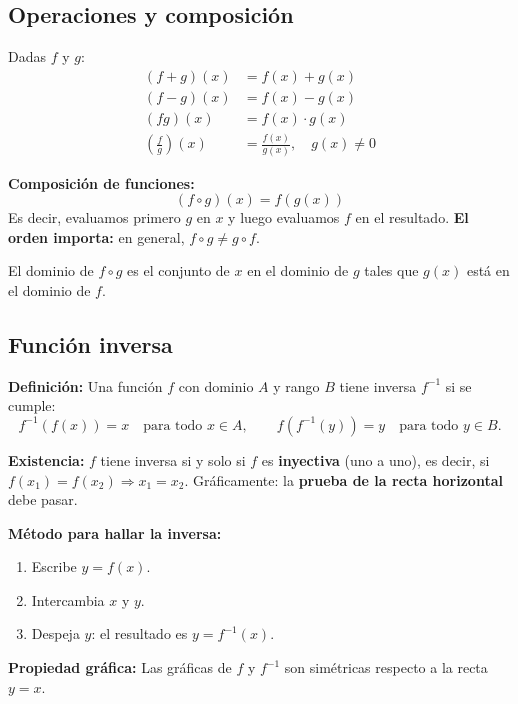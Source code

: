 \documentclass[12pt, letterpaper]{article}
\begin{document}
\subsection{Operaciones y composición}

\begin{cuadroteoria}
  Dadas $f$ y $g$:
  \begin{align*}
    (f + g)(x)                  & = f(x) + g(x)                          \\
    (f - g)(x)                  & = f(x) - g(x)                          \\
    (fg)(x)                     & = f(x) \cdot g(x)                      \\
    \left(\frac{f}{g}\right)(x) & = \frac{f(x)}{g(x)}, \quad g(x) \neq 0
  \end{align*}
\end{cuadroteoria}

\begin{cuadrosolucion}
  \textbf{Composición de funciones:}
  $$(f \circ g)(x) = f(g(x))$$
  Es decir, evaluamos primero $g$ en $x$ y luego evaluamos $f$ en el resultado. \textbf{El orden importa:} en general, $f \circ g \neq g \circ f$.

  El dominio de $f \circ g$ es el conjunto de $x$ en el dominio de $g$ tales que $g(x)$ está en el dominio de $f$.
\end{cuadrosolucion}

\newpage

\subsection{Función inversa}

\begin{cuadroteoria}
  \textbf{Definición:} Una función $f$ con dominio $A$ y rango $B$ tiene inversa $f^{-1}$ si se cumple:
  $$f^{-1}(f(x)) = x \quad \text{para todo } x \in A, \qquad f(f^{-1}(y)) = y \quad \text{para todo } y \in B.$$

  \textbf{Existencia:} $f$ tiene inversa si y solo si $f$ es \textbf{inyectiva} (uno a uno), es decir, si $f(x_1) = f(x_2) \Rightarrow x_1 = x_2$. Gráficamente: la \textbf{prueba de la recta horizontal} debe pasar.

  \textbf{Método para hallar la inversa:}
  \begin{enumerate}[leftmargin=*]
    \item Escribe $y = f(x)$.
    \item Intercambia $x$ y $y$.
    \item Despeja $y$: el resultado es $y = f^{-1}(x)$.
  \end{enumerate}

  \textbf{Propiedad gráfica:} Las gráficas de $f$ y $f^{-1}$ son simétricas respecto a la recta $y = x$.
\end{cuadroteoria}
\end{document}
